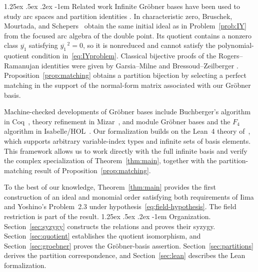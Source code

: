 \documentclass[11pt,reqno]{amsart}
\makeatletter
\theoremstyle{definition}
\theoremstyle{remark}
\theoremstyle{plain}
\renewcommand{\paragraph}{%
  \@startsection{paragraph}{4}{\z@}%
    {1.25ex \@plus .5ex \@minus .2ex}%
    {-1em}%
    {\normalfont\normalsize\bfseries}}
\makeatother
\begin{document}
\paragraph{Related work}
Infinite Gr\"obner bases have been used to study arc spaces and
partition identities
\cite{AfsharijooMourtada2020, BaiGorskyKivinen2020,BruschekMourtadaSchepers2013}.
In characteristic zero, Bruschek, Mourtada, and
Schepers~\cite[Section~5]{BruschekMourtadaSchepers2013} obtain the
same initial ideal as in Problem~\ref{prob:IY} from the focused arc
algebra of the double point. Its quotient contains a nonzero class
\(\overline{y_1}\) satisfying \(\overline{y_1}^{\,2}=0\), so it is
nonreduced and cannot satisfy the polynomial-quotient condition
in~\eqref{eq:IYproblem}. Classical bijective proofs of the
Rogers–Ramanujan identities were given by Garsia–Milne and
Bressoud–Zeilberger \cite{BressoudZeilberger1982,GarsiaMilne1981}.
Proposition~\ref{prop:matching} obtains a partition bijection by
selecting a perfect matching in the support of the normal-form
matrix associated with our Gr\"obner basis.

Machine-checked developments of Gr\"obner bases include Buchberger's
algorithm in Coq~\cite{Thery2001}, theory refinement in
Mizar~\cite{Schwarzweller2006}, and module Gr\"obner bases and the
\(F_4\) algorithm in Isabelle/HOL~\cite{MaletzkyImmler2018}.
Our formalization builds on the Lean~4 theory
of~\cite{GuoShenLiuZhi2026}, which supports arbitrary variable-index
types and infinite sets of basis elements. This framework allows us
to work directly with the full infinite basis and verify the complex
specialization of Theorem~\ref{thm:main}, together with the
partition-matching result of Proposition~\ref{prop:matching}.

To the best of our knowledge, Theorem~\ref{thm:main} provides the
first construction of an ideal and monomial order satisfying both
requirements of Iima and Yoshino's Problem~2.3 under
hypothesis~\eqref{eq:field-hypothesis}. The field restriction is part
of the result.
\paragraph{Organization.}
Section~\ref{sec:syzygy} constructs the relations and proves their
syzygy. Section~\ref{sec:quotient} establishes the quotient
isomorphism, and Section~\ref{sec:groebner} proves the
Gr\"obner-basis assertion. Section~\ref{sec:partitions} derives
the partition correspondence, and Section~\ref{sec:lean}
describes the Lean formalization.
\end{document}
